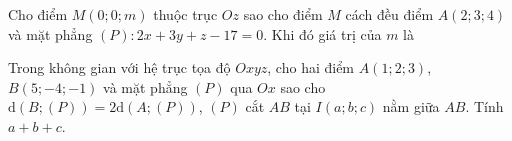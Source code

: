 \begin{ex} %
	Cho điểm $M \left(0;0;m\right)$ thuộc trục $Oz$ sao cho điểm $M$ cách đều điểm $A \left(2;3;4\right)$ và mặt phẳng $\left(P\right) \colon 2x+3y+z-17=0$. Khi đó giá trị của $m$ là
\end{ex}

\begin{ex} %
	Trong không gian với hệ trục tọa độ $Oxyz$, cho hai điểm $A \left(1;2;3\right)$, $B\left(5;-4;-1\right)$ và mặt phẳng $\left(P\right)$ qua $Ox$ sao cho $\mathrm{d} \left(B;\left(P\right)\right) = 2\mathrm{d} \left(A;\left(P\right)\right)$, $\left(P\right)$ cắt $AB$ tại $I\left(a;b;c\right)$ nằm giữa $AB$. Tính $a+b+c$.
\end{ex}

